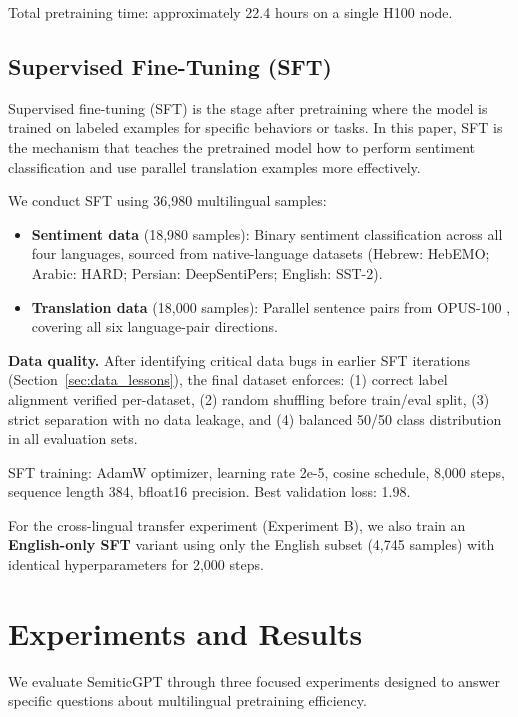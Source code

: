 \documentclass[10pt,twocolumn]{article}
\begin{document}
Total pretraining time: approximately 22.4 hours on a single H100 node.

\subsection{Supervised Fine-Tuning (SFT)}
\label{sec:sft}

Supervised fine-tuning (SFT) is the stage after pretraining where the model is trained on labeled examples for specific behaviors or tasks. In this paper, SFT is the mechanism that teaches the pretrained model how to perform sentiment classification and use parallel translation examples more effectively.

We conduct SFT using 36,980 multilingual samples:

\begin{itemize}
    \item \textbf{Sentiment data} (18,980 samples): Binary sentiment classification across all four languages, sourced from native-language datasets (Hebrew: HebEMO; Arabic: HARD; Persian: DeepSentiPers; English: SST-2).
    \item \textbf{Translation data} (18,000 samples): Parallel sentence pairs from OPUS-100 \citep{zhang2020improving}, covering all six language-pair directions.
\end{itemize}

\textbf{Data quality.} After identifying critical data bugs in earlier SFT iterations (Section~\ref{sec:data_lessons}), the final dataset enforces: (1) correct label alignment verified per-dataset, (2) random shuffling before train/eval split, (3) strict separation with no data leakage, and (4) balanced 50/50 class distribution in all evaluation sets.

SFT training: AdamW optimizer, learning rate 2e-5, cosine schedule, 8,000 steps, sequence length 384, bfloat16 precision. Best validation loss: 1.98.

For the cross-lingual transfer experiment (Experiment B), we also train an \textbf{English-only SFT} variant using only the English subset (4,745 samples) with identical hyperparameters for 2,000 steps.

\section{Experiments and Results}

We evaluate SemiticGPT through three focused experiments designed to answer specific questions about multilingual pretraining efficiency.
\end{document}
